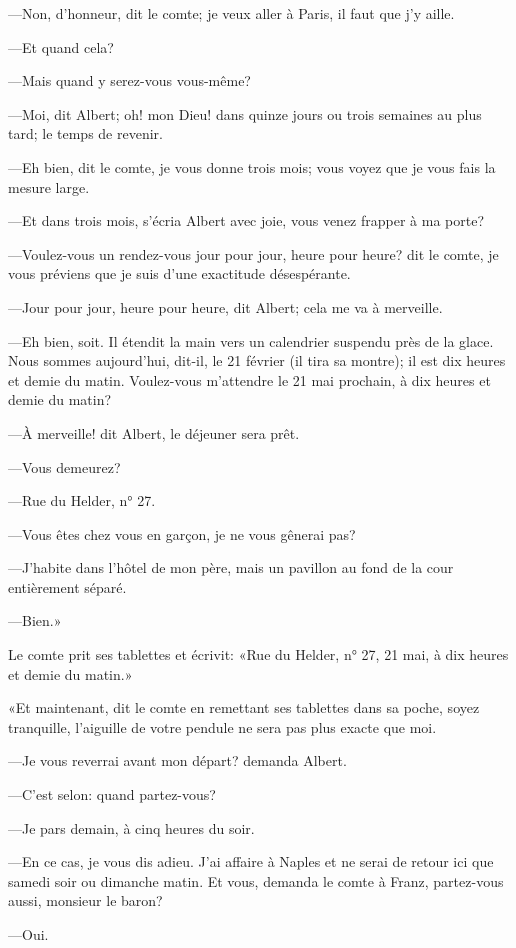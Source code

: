 —Non, d'honneur, dit le comte; je veux aller à Paris, il faut que j'y aille. 

—Et quand cela? 

—Mais quand y serez-vous vous-même? 

—Moi, dit Albert; oh! mon Dieu! dans quinze jours ou trois semaines au plus tard; le temps de revenir. 

—Eh bien, dit le comte, je vous donne trois mois; vous voyez que je vous fais la mesure large. 

—Et dans trois mois, s'écria Albert avec joie, vous venez frapper à ma porte? 

—Voulez-vous un rendez-vous jour pour jour, heure pour heure? dit le comte, je vous préviens que je suis d'une exactitude désespérante. 

—Jour pour jour, heure pour heure, dit Albert; cela me va à merveille. 

—Eh bien, soit. Il étendit la main vers un calendrier suspendu près de la glace. Nous sommes aujourd'hui, dit-il, le 21 février (il tira sa montre); il est dix heures et demie du matin. Voulez-vous m'attendre le 21 mai prochain, à dix heures et demie du matin?  

—À merveille! dit Albert, le déjeuner sera prêt. 

—Vous demeurez? 

—Rue du Helder, n° 27. 

—Vous êtes chez vous en garçon, je ne vous gênerai pas? 

—J'habite dans l'hôtel de mon père, mais un pavillon au fond de la cour entièrement séparé. 

—Bien.» 

Le comte prit ses tablettes et écrivit: «Rue du Helder, n° 27, 21 mai, à dix heures et demie du matin.» 

«Et maintenant, dit le comte en remettant ses tablettes dans sa poche, soyez tranquille, l'aiguille de votre pendule ne sera pas plus exacte que moi. 

—Je vous reverrai avant mon départ? demanda Albert. 

—C'est selon: quand partez-vous? 

—Je pars demain, à cinq heures du soir. 

—En ce cas, je vous dis adieu. J'ai affaire à Naples et ne serai de retour ici que samedi soir ou dimanche matin. Et vous, demanda le comte à Franz, partez-vous aussi, monsieur le baron?  

—Oui. 

